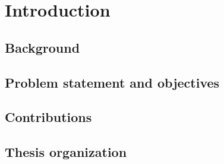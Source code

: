\chapter{Introduction}
\label{chap:introduction}


\section{Background}

\section{Problem statement and objectives}

\section{Contributions}

\section{Thesis organization}
